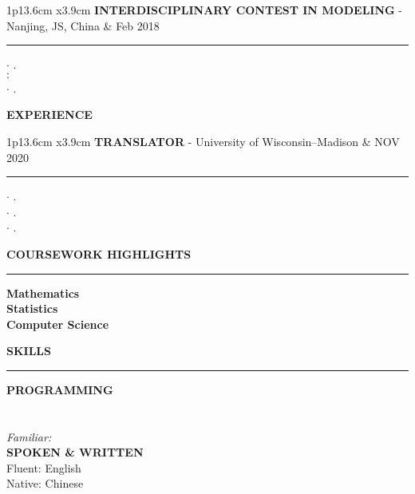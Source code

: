 \documentclass[11pt,A4]{article}
\newcommand{\cvsection}[1]
{
	\begin{center}
		\large\textcolor{sectcol}{\textbf{#1}}
	\end{center}
}
\newcommand{\cvevent}[3]
{

\begin{tabular*}{1\textwidth}{p{13.6cm}  x{3.9cm}}
	\textbf{#2} - \textcolor{bgcol}{#3} &   \vspace{2.5pt}\textcolor{sectcol}{#1}
\end{tabular*}

\vspace{-8pt}
\textcolor{softcol}{\hrule}
\vspace{6pt}


}
\begin{document}
\cvevent{Feb 2018}
        {INTERDISCIPLINARY CONTEST IN MODELING}
        {Nanjing, JS, China}

        $\cdot$ \randomstring.\\
        $\cdot$ \randomstring\\
        $\cdot$ \randomstring\\
        $\cdot$ \randomstring.\\



\cvsection{EXPERIENCE}
\cvevent{NOV 2020}
        {TRANSLATOR}
        {University of Wisconsin–Madison}

        $\cdot$ \randomstring.\\
        $\cdot$ \randomstring.\\
        $\cdot$ \randomstring.\\


\newpage


\cvsection{COURSEWORK HIGHLIGHTS}
\vspace{-18pt}
\textcolor{softcol}{\hrule}
\vspace{6pt}

\textbf{Mathematics}
\randomstring\\

\textbf{Statistics}
\randomstring\\

\textbf{Computer Science}
\randomstring\\


\cvsection{SKILLS}
\vspace{-18pt}
\textcolor{softcol}{\hrule}
\vspace{6pt}

\textbf{PROGRAMMING}\\
\randomstring\\
\randomstring\\
\textit{Familiar:}
\randomstring\\

\textbf{SPOKEN \& WRITTEN}\\
Fluent: English \\
Native: Chinese\\
\end{document}
